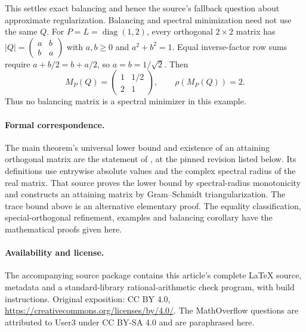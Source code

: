 \documentclass[11pt]{article}
\newcommand{\diag}{\operatorname{diag}}
\begin{document}
This settles exact balancing and hence the source's fallback question
about approximate regularization. Balancing and spectral minimization
need not use the same $Q$. For $P=L=\diag(1,2)$, every orthogonal
$2\times2$ matrix has
$|Q|=\left(\begin{smallmatrix}a&b\\b&a\end{smallmatrix}\right)$ with
$a,b\geq0$ and $a^2+b^2=1$. Equal inverse-factor row sums require
$a+b/2=b+a/2$, so $a=b=1/\sqrt2$. Then
\[
 M_P(Q)=\begin{pmatrix}1&1/2\\2&1\end{pmatrix},\qquad
 \rho(M_P(Q))=2.
\]
Thus no balancing matrix is a spectral minimizer in this example.

\paragraph{Formal correspondence.}
The main theorem's universal lower bound and existence of an attaining
orthogonal matrix are the statement of \cite[\texttt{result}]{formal},
at the pinned revision listed below. Its definitions use entrywise absolute
values and the complex spectral radius of the real matrix. That source
proves the lower bound by spectral-radius monotonicity and constructs an
attaining matrix by Gram--Schmidt triangularization. The trace bound above
is an alternative elementary proof. The equality classification,
special-orthogonal refinement, examples and balancing corollary have the
mathematical proofs given here.

\paragraph{Availability and license.}
The accompanying source package contains this article's complete LaTeX
source, metadata and a standard-library rational-arithmetic check program,
with build instructions. Original exposition: CC BY 4.0,
\url{https://creativecommons.org/licenses/by/4.0/}.
The MathOverflow questions are attributed to User3 under CC BY-SA 4.0
and are paraphrased here.
\end{document}
